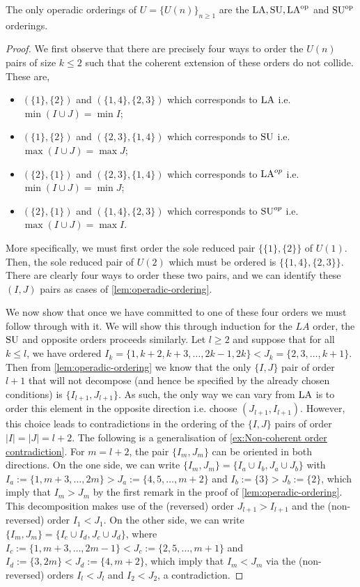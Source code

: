 \begin{proposition}
The only operadic orderings of $U=\{U(n)\}_{n\geq 1}$ are the $\mathrm{LA},\mathrm{SU},\mathrm{LA}^{\mathrm{op}}$ and $\mathrm{SU}^{\mathrm{op}}$ orderings.
\end{proposition}

\begin{proof}
We first observe that there are precisely four ways to order the $U(n)$ pairs of size $k\leq 2$ such that the coherent extension of these orders do not collide.
These are,
\begin{itemize} 
    \item $(\{1\},\{2\})$ and $(\{1,4\},\{2,3\})$ which corresponds to $\mathrm{LA}$ i.e. $\min(I\cup J) = \min I$;
    \item $(\{1\},\{2\})$ and $(\{2,3\},\{1,4\})$ which corresponds to $\mathrm{SU}$ i.e. $\max(I\cup J) = \max J$;
    \item $(\{2\},\{1\})$ and $(\{2,3\},\{1,4\})$ which corresponds to $\mathrm{LA}^{op}$ i.e. $\min(I\cup J) = \min J$;
    \item $(\{2\},\{1\})$ and $(\{1,4\},\{2,3\})$ which corresponds to $\mathrm{SU}^{op}$ i.e. $\max(I\cup J) = \max I$.
\end{itemize}
More specifically, we must first order the sole reduced pair $\{\{1\},\{2\}\}$ of $U(1)$.
Then, the sole reduced pair of $U(2)$ which must be ordered is $\{\{1,4\},\{2,3\} \}$.
There are clearly four ways to order these two pairs, and we can identify these $(I,J)$ pairs as cases of \cref{lem:operadic-ordering}.

We now show that once we have committed to one of these four orders we must follow through with it.
We will show this through induction for the $LA$ order, the $\mathrm{SU}$ and opposite orders proceeds similarly.
Let $l\geq 2$ and suppose that for all $k\leq l$, we have ordered $I_k=\{1,k+2,k+3,\dots,2k-1,2k\} < J_k=\{2,3,\dots,k+1\}$.
Then from \cref{lem:operadic-ordering} we know that the only $\{I,J\}$ pair of order $l+1$ that will not decompose (and hence be specified by the already chosen conditions) is $\{I_{l+1},J_{l+1}\}$.
As such, the only way we can vary from $\mathrm{LA}$ is to order this element in the opposite direction i.e. choose $(J_{l+1},I_{l+1})$.
However, this choice leads to contradictions in the ordering of the $\{I,J\}$ pairs of order $|I|=|J|=l+2$.
The following is a generalisation of \cref{ex:Non-coherent order contradiction}.
For $m = l+2$, the pair $\{I_m,J_m\}$ can be oriented in both directions.
On the one side, we can write $\{I_m,J_m\} = \{I_a \cup I_b, J_a \cup J_b\}$ with $I_a:= \{1,m+3,\dots,2m\} > J_a:= \{4,5,\dots,m+2\}$  and $I_b:=\{3\} > J_b:= \{2\}$, which imply that $I_m > J_m$ by the first remark in the proof of \cref{lem:operadic-ordering}. 
This decomposition makes use of the (reversed) order $J_{l+1} > I_{l+1}$ and the (non-reversed) order $I_1 < J_1$.
On the other side, we can write $\{I_m,J_m\} = \{I_c \cup I_d, J_c \cup J_d\}$, where $I_c:= \{1,m+3,\dots,  2m-1\} < J_c:= \{2,5,\dots,m+1\}$ and $I_d:=\{3, 2m\} < J_d:= \{4, m+2\}$, which imply that $I_m < J_m$ via the (non-reversed) orders $I_l < J_l$ and $I_2 < J_2$, a contradiction.
\end{proof}

